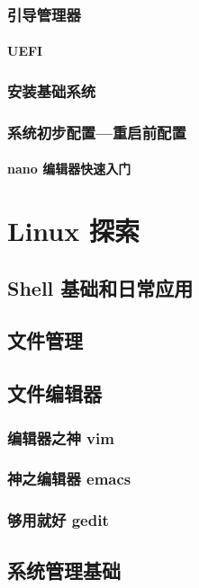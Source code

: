 \documentclass[amstex,twoside]{ctexbook}
\begin{document}
\subsection{引导管理器}
\subsubsection{UEFI}

\subsection{安装基础系统}
\subsection{系统初步配置—重启前配置}

\subsubsection{nano 编辑器快速入门}

\chapter{Linux 探索}
\section{Shell 基础和日常应用}

\section{文件管理}	
\section{文件编辑器}
\subsection{编辑器之神 vim	}
\subsection{神之编辑器 emacs	}
\subsection{够用就好 gedit	}
\section{系统管理基础}
\end{document}
